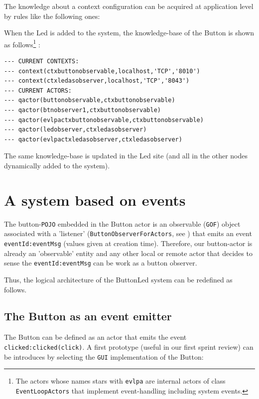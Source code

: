 The knowledge about a context configuration can be acquired at application level by rules like the following ones:


 
When the Led is added to the system,  the knowledge-base of the Button is shown as follows\footnote{The actors whose names stars with \texttt{evlpa} are internal actors of class \texttt{EventLoopActors} that implement event-handling including system events.} :

\begin{lstlisting}
--- CURRENT CONTEXTS:
--- context(ctxbuttonobservable,localhost,'TCP','8010')
--- context(ctxledasobserver,localhost,'TCP','8043')
--- CURRENT ACTORS:
--- qactor(buttonobservable,ctxbuttonobservable)
--- qactor(btnobserver1,ctxbuttonobservable)
--- qactor(evlpactxbuttonobservable,ctxbuttonobservable)
--- qactor(ledobserver,ctxledasobserver)
--- qactor(evlpactxledasobserver,ctxledasobserver)
\end{lstlisting}

The same knowledge-base is updated in the Led site (and all in the other nodes dynamically added to the system).

\newpage 
\section{A system based on events}
The button-\texttt{POJO} embedded in the Button actor is an observable (\texttt{GOF}) object associated with a 'listener' (\texttt{ButtonObserverForActors}, see ) that emits an event \texttt{eventId:eventMsg} (values given at creation time).
%
Therefore, our button-actor is already an 'observable' entity and any other local or remote actor that decides to sense the \texttt{eventId:eventMsg} can be work as a button observer.   

Thus, the logical architecture of the ButtonLed system can be redefined as follows.

\subsection{The Button as an event emitter}
The Button can be defined as an actor that emits the event \texttt{clicked:clicked(click)}. A first prototype (useful in our first sprint review) can be introduces by selecting the \texttt{GUI} implementation of the Button:   

